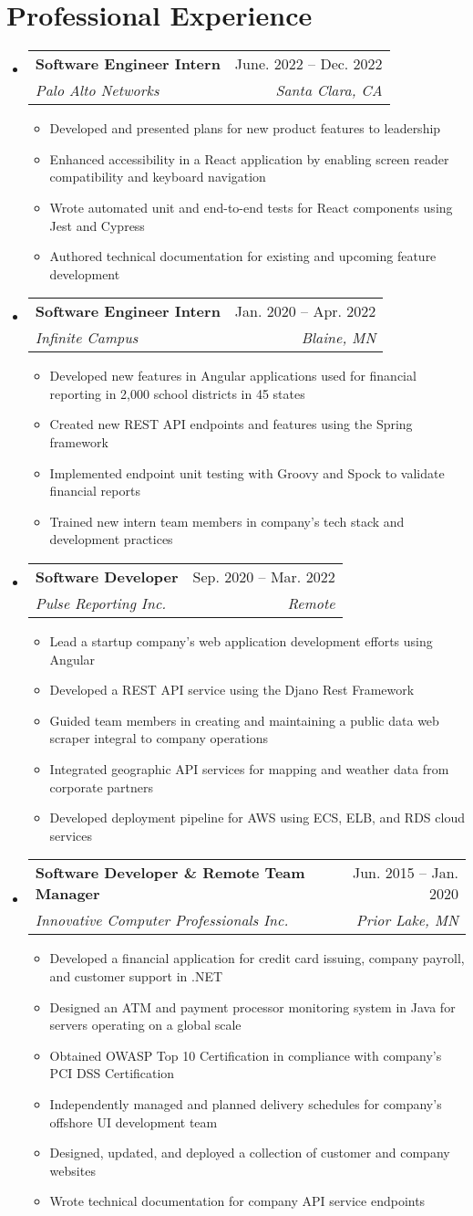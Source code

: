 \documentclass[letterpaper,11pt]{article}
\makeatletter
\newcommand{\resumeItem}[1]{\item\small{{#1 \vspace{-2pt}}}}
\newcommand{\resumeSection}[2]{\section{#1}\begin{itemize}[leftmargin=0.15in, label={}]#2\end{itemize}}
\newcommand{\resumeItemHeading}[4]{\vspace{-2pt}\item{\begin{tabular*}{0.97\textwidth}[t]{l@{\extracolsep{\fill}}r}\textbf{#1} & #2\\\textit{\small#3} & \textit{\small #4}\\\end{tabular*}\vspace{-7pt}}}
\newcommand{\resumeItemList}[1]{\begin{itemize}#1\end{itemize}\vspace{-5pt}}
\makeatother
\begin{document}
\resumeSection{Professional Experience}{
	\resumeItemHeading{Software Engineer Intern}{June. 2022 -- Dec. 2022}{Palo Alto Networks}{Santa Clara, CA}
	\resumeItemList{
		\resumeItem{Developed and presented plans for new product features to leadership}
		\resumeItem{Enhanced accessibility in a React application by enabling screen reader compatibility and keyboard navigation}
		\resumeItem{Wrote automated unit and end-to-end tests for React components using Jest and Cypress}
		\resumeItem{Authored technical documentation for existing and upcoming feature development}
	}

	\resumeItemHeading{Software Engineer Intern}{Jan. 2020 -- Apr. 2022}{Infinite Campus}{Blaine, MN}
	\resumeItemList{
		\resumeItem{Developed new features in Angular applications used for financial reporting in 2,000 school districts in 45 states}
		\resumeItem{Created new REST API endpoints and features using the Spring framework}
		\resumeItem{Implemented endpoint unit testing with Groovy and Spock to validate financial reports}
		\resumeItem{Trained new intern team members in company's tech stack and development practices}
	}

	\resumeItemHeading{Software Developer}{Sep. 2020 -- Mar. 2022}{Pulse Reporting Inc.}{Remote}
	\resumeItemList{
		\resumeItem{Lead a startup company's web application development efforts using Angular}
		\resumeItem{Developed a REST API service using the Djano Rest Framework}
		\resumeItem{Guided team members in creating and maintaining a public data web scraper integral to company operations}
		\resumeItem{Integrated geographic API services for mapping and weather data from corporate partners}
		\resumeItem{Developed deployment pipeline for AWS using ECS, ELB, and RDS cloud services}
	}

	\resumeItemHeading{Software Developer \& Remote Team Manager}{Jun. 2015 -- Jan. 2020}{Innovative Computer Professionals Inc.}{Prior Lake, MN}
	\resumeItemList{
		\resumeItem{Developed a financial application for credit card issuing, company payroll, and customer support in .NET}
		\resumeItem{Designed an ATM and payment processor monitoring system in Java for servers operating on a global scale}
		\resumeItem{Obtained OWASP Top 10 Certification in compliance with company’s PCI DSS Certification}
		\resumeItem{Independently managed and planned delivery schedules for company’s offshore UI development team}
		\resumeItem{Designed, updated, and deployed a collection of customer and company websites}
		\resumeItem{Wrote technical documentation for company API service endpoints}
	}
}
\end{document}
